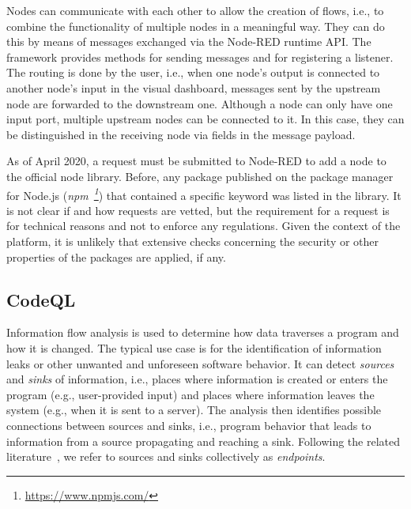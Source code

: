 Nodes can communicate with each other to allow the creation of flows, i.e., to combine the functionality of multiple nodes in a meaningful way.
They can do this by means of messages exchanged via the Node-RED runtime API.
The framework provides methods for sending messages and for registering a listener.
The routing is done by the user, i.e., when one node's output is connected to another node's input in the visual dashboard, messages sent by the upstream node are forwarded to the downstream one.
Although a node can only have one input port, multiple upstream nodes can be connected to it. 
In this case, they can be distinguished in the receiving node via fields in the message payload.


As of April 2020, a request must be submitted to Node-RED to add a node to the official node library.
Before, any package published on the package manager for Node.js (\textit{npm~\footnote{\;\url{https://www.npmjs.com/}}}) that contained a specific keyword was listed in the library.
It is not clear if and how requests are vetted, but the requirement for a request is for technical reasons and not to enforce any regulations.
Given the context of the platform, it is unlikely that extensive checks concerning the security or other properties of the packages are applied, if any.




\subsection{CodeQL}
\label{sub:codeql}

Information flow analysis is used to determine how data traverses a program and how it is changed. 
The typical use case is for the identification of information leaks or other unwanted and unforeseen software behavior.
It can detect \textit{sources} and \textit{sinks} of information, i.e., places where information is created or enters the program (e.g., user-provided input) and places where information leaves the system (e.g., when it is sent to a server).
The analysis then identifies possible connections between sources and sinks, i.e., program behavior that leads to information from a source propagating and reaching a sink.
Following the related literature~\cite{Krohn07_flume_information_flo_control}, we refer to sources and sinks collectively as \textit{endpoints}.

